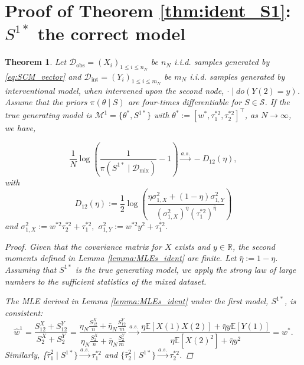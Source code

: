 \documentclass[accepted]{uai2026} %
\newcommand{\train}{\mathcal{D}}
\newcommand{\obsdata}{\train_{\text{obs}}}
\newcommand{\mixdata}{\train_{\text{mix}}}
\newcommand{\tsone}{\tau_1^{*2}}
\newcommand{\tstwo}{\tau_2^{*2}}
\newcommand{\intdata}{\train_{\text{int}}}
\def\transpose{\intercal}
\theoremstyle{boldremark}
\newtheorem{theorem}{Theorem}[section]
\begin{document}
\section{Proof of Theorem \ref{thm:ident_S1}: \texorpdfstring{$S^{1*}$}{S1*} the correct model}
\label{appendix:proof_thm1_ident}

\begin{theorem}
    \label{thm:ident_S1_app}
    Let $\obsdata = (X_i)_{1\leq i \leq n_N}$ be $n_N$ i.i.d. samples generated by \eqref{eq:SCM_vector} and $\intdata = (Y_i)_{1\leq i\leq m_N}$ be $m_N$ i.i.d. samples generated by interventional model, when intervened upon the second node, $\cdot\mid do(Y(2) = y )$. Assume that the priors $\pi(\theta\mid S)$ are four-times differentiable for $S \in \mathcal{S}$. If the true generating model is $\mathcal{M}^1 = \{\theta^*, S^{1*}\}$ with $\theta^*:= [w^*, \tsone, \tstwo]^\transpose$, as $N \to \infty$, we have,

    \[
        \frac{1}{N} \log \left( \frac{1}{\pi(S^{1*} \mid \mixdata)} - 1 \right) \xrightarrow{a.s.} -D_{12}(\eta),
    \]
    with 
\begin{equation}
    \label{eq:D_12_def_app}
    D_{12}(\eta) := \frac{1}{2} \log \left( \frac{\eta \sigma_{1,X}^2 + (1-\eta) \sigma_{1,Y}^2}{(\sigma_{1,X}^2)^\eta (\tsone)^{\bar{\eta}}} \right)
\end{equation}
    and  $\sigma_{1,X}^2:=w^{*2}\tstwo+\tsone,$ $\sigma_{1, Y}^2 := w^{*2}y^2+\tsone$.

\begin{proof}
    Given that the covariance matrix for $X$ exists and $y \in \mathbb{R}$, the second moments defined in Lemma \ref{lemma:MLEs_ident} are finite. Let $\bar{\eta} := 1 - \eta$. Assuming that $S^{1*}$ is the true generating model, we apply the strong law of large numbers to the sufficient statistics of the mixed dataset.

    The MLE derived in Lemma \ref{lemma:MLEs_ident} under the first model, $S^{1*}$, is consistent:
    \[
        \hat{w}^1 = \frac{S_{12}^X+S_{12}^Y}{S_2^X+S_2^Y} = \frac{\eta_N \frac{S_{12}^X}{n} + \bar{\eta}_N \frac{S_{12}^Y}{m}}{\eta_N \frac{S_{2}^X}{n} + \bar{\eta}_N \frac{S_{2}^Y}{m}} 
        \xrightarrow{a.s.} \frac{\eta\mathbb{E}[X(1)X(2)] + \bar{\eta}y\mathbb{E}[Y(1)]}{\eta\mathbb{E}[X(2)^2] + \bar{\eta}y^2} = w^*.
    \]
    Similarly, \{$\hat{\tau}_1^{2}  \mid S^{1*}\}\xrightarrow{a.s.} \tau_1^{*2}$ and $\{\hat{\tau}_2^{2} \mid S^{1*}\}  \xrightarrow{a.s.} \tau_2^{*2}$.


\end{proof}
\end{theorem}
\end{document}
